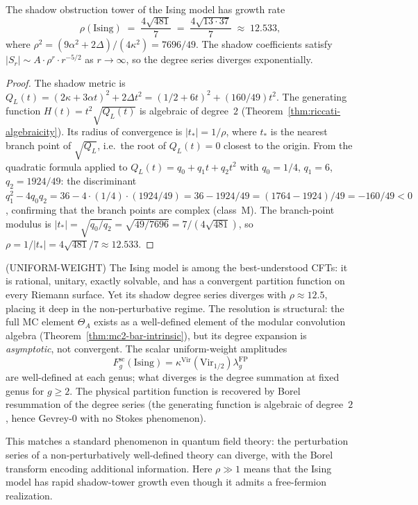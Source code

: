 \begin{theorem}%
\label{thm:ising-shadow-growth-rate}
The shadow obstruction tower of the Ising model has growth rate
\begin{equation}\label{eq:ising-shadow-rho}
\rho(\mathrm{Ising})
\;=\; \frac{4\sqrt{481}}{7}
\;=\; \frac{4\sqrt{13 \cdot 37}}{7}
\;\approx\; 12.533,
\end{equation}
where $\rho^2 = (9\alpha^2 + 2\Delta)/(4\kappa^2) = 7696/49$.
The shadow coefficients satisfy $|S_r| \sim A \cdot \rho^r \cdot r^{-5/2}$
as $r \to \infty$, so the degree series diverges exponentially.
\end{theorem}

\begin{proof}
The shadow metric is $Q_L(t) = (2\kappa + 3\alpha t)^2 + 2\Delta t^2
= (1/2 + 6t)^2 + (160/49)t^2$. The generating function
$H(t) = t^2\sqrt{Q_L(t)}$ is algebraic of degree~$2$
(Theorem~\ref{thm:riccati-algebraicity}). Its radius of
convergence is $|t_*| = 1/\rho$, where $t_*$ is the nearest
branch point of $\sqrt{Q_L}$, i.e.\ the root of $Q_L(t) = 0$
closest to the origin. From the quadratic formula applied to
$Q_L(t) = q_0 + q_1 t + q_2 t^2$ with
$q_0 = 1/4$, $q_1 = 6$, $q_2 = 1924/49$:
the discriminant $q_1^2 - 4q_0 q_2 = 36 - 4 \cdot (1/4) \cdot (1924/49)
= 36 - 1924/49 = (1764 - 1924)/49 = -160/49 < 0$,
confirming that the branch points are complex (class~M).
The branch-point modulus is
$|t_*| = \sqrt{q_0/q_2} = \sqrt{49/7696} = 7/(4\sqrt{481})$,
so $\rho = 1/|t_*| = 4\sqrt{481}/7 \approx 12.533$.
\end{proof}

\begin{remark}%
\textup{(}UNIFORM-WEIGHT\textup{})
\label{rem:ising-divergence-paradox}
The Ising model is among the best-understood CFTs: it is rational,
unitary, exactly solvable, and has a convergent partition function on
every Riemann surface. Yet its shadow degree series diverges
with $\rho \approx 12.5$, placing it deep in the non-perturbative
regime. The resolution is structural: the full MC element
$\Theta_A$ exists as a well-defined element of the modular
convolution algebra (Theorem~\ref{thm:mc2-bar-intrinsic}),
but its degree expansion is \emph{asymptotic}, not convergent.
The scalar uniform-weight amplitudes
\[
F_g^{\mathrm{sc}}(\mathrm{Ising})
=\kappa^{\mathrm{Vir}}(\mathrm{Vir}_{1/2})
 \lambda_g^{\mathrm{FP}}
\]
are well-defined at each genus; what diverges is the degree
summation at fixed genus for $g \ge 2$. The physical partition
function is recovered by
Borel resummation of the degree series
(the generating function is algebraic of degree~$2$, hence
Gevrey-$0$ with no Stokes phenomenon).

This matches a standard phenomenon in quantum field theory: the
perturbation series of a non-perturbatively well-defined theory can
diverge, with the Borel transform encoding additional information.
Here $\rho \gg 1$ means that the Ising model has rapid shadow-tower
growth even though it admits a free-fermion realization.
\end{remark}

